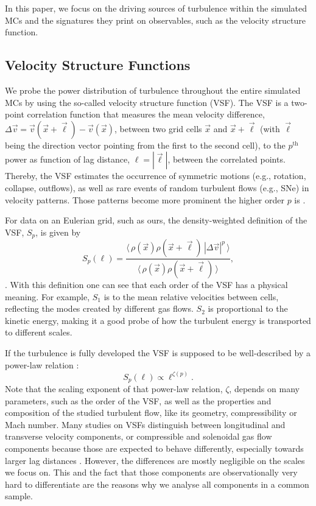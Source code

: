 In this paper, we focus on the driving sources of turbulence within the simulated MCs and the signatures they print on observables, such as the velocity structure function.


\subsection{Velocity Structure Functions}\label{methods:vsf}

We probe the power distribution of turbulence throughout the entire simulated MCs by using the so-called velocity structure function (VSF).
The VSF is a two-point correlation function that measures the mean velocity difference, $\Delta \vec{v} = \vec{v}(\vec{x}+\vec{\ell}) - \vec{v}(\vec{x})$, between two grid cells $\vec{x}$ and $\vec{x}+\vec{\ell}$ (with $\vec{\ell}$ being the direction vector pointing from the first to the second cell), to the $p^\mathrm{th}$ power as function of lag distance, $\ell = |\vec{\ell}|$, between the correlated points.
Thereby, the VSF estimates the occurrence of symmetric motions (e.g., rotation, collapse, outflows), as well as rare events of random turbulent flows (e.g., SNe) in velocity patterns.
Those patterns become more prominent the higher order $p$ is \citep{Heyer2004}.

For data on an Eulerian grid, such as ours, the density-weighted definition of the VSF, $\mathit{S}_p$, is given by
\begin{equation}
	\mathit{S}_p (\ell) = \frac{\langle \, \rho(\vec{x}) \rho(\vec{x}+\vec{\ell}) \, |\Delta \vec{v}|^p  \, \rangle}{\langle  \, \rho(\vec{x}) \rho(\vec{x}+\vec{\ell}) \, \rangle} ,
    \label{equ:method:def_vsf}
\end{equation}
\citep[and references within]{Padoan2016a}.
With this definition one can see that each order of the VSF has a physical meaning. 
For example, $\mathit{S}_1$ is to the mean relative velocities between cells, reflecting the modes created by different gas flows.
$\mathit{S}_2$ is proportional to the kinetic energy, making it a good probe of how the turbulent energy is transported to different scales.

If the turbulence is fully developed the VSF is supposed to be well-described by a power-law relation \citep{Kolmogorov1941,She1994,Boldyrev2002}:
\begin{equation}
	\mathit{S}_p (\ell) \propto \ell^{\zeta(p)} .
    \label{equ:method:propto_zeta}
\end{equation}
Note that the scaling exponent of that power-law relation, $\zeta$, depends on many parameters, such as the order of the VSF, as well as the properties and composition of the studied turbulent flow, like its geometry, compressibility or Mach number.
Many studies on VSFs distinguish between longitudinal and transverse velocity components, or compressible and solenoidal gas flow components because those are expected to behave differently, especially towards larger lag distances \citep{Gotoh2002,Schmidt2008,Benzi2010}.
However, the differences are mostly negligible on the scales we focus on. 
This and the fact that those components are observationally very hard to differentiate are the reasons why we analyse all components in a common sample.

